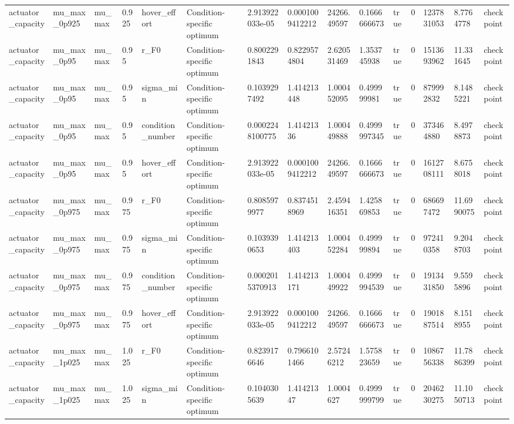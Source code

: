\begin{tabular}{@{}lllllllllllllll@{}}
actuator\_capacity & mu\_max\_0p925 & mu\_max & 0.925 & hover\_effort & Condition-specific optimum & 2.913922033e-05 & 0.0001009412212 & 24266.49597 & 0.1666666673 & true & 0 & 1237831053 & 8.7764778 & checkpoint \\
actuator\_capacity & mu\_max\_0p95 & mu\_max & 0.95 & r\_F0 & Condition-specific optimum & 0.8002291843 & 0.8229574804 & 2.620531469 & 1.353745938 & true & 0 & 1513693962 & 11.331645 & checkpoint \\
actuator\_capacity & mu\_max\_0p95 & mu\_max & 0.95 & sigma\_min & Condition-specific optimum & 0.1039297492 & 1.414213448 & 1.000452095 & 0.499999981 & true & 0 & 879992832 & 8.1485221 & checkpoint \\
actuator\_capacity & mu\_max\_0p95 & mu\_max & 0.95 & condition\_number & Condition-specific optimum & 0.0002248100775 & 1.41421336 & 1.000449888 & 0.4999997345 & true & 0 & 373464880 & 8.4978873 & checkpoint \\
actuator\_capacity & mu\_max\_0p95 & mu\_max & 0.95 & hover\_effort & Condition-specific optimum & 2.913922033e-05 & 0.0001009412212 & 24266.49597 & 0.1666666673 & true & 0 & 1612708111 & 8.6758018 & checkpoint \\
actuator\_capacity & mu\_max\_0p975 & mu\_max & 0.975 & r\_F0 & Condition-specific optimum & 0.8085979977 & 0.8374518969 & 2.459416351 & 1.425869853 & true & 0 & 686697472 & 11.6990075 & checkpoint \\
actuator\_capacity & mu\_max\_0p975 & mu\_max & 0.975 & sigma\_min & Condition-specific optimum & 0.1039390653 & 1.414213403 & 1.000452284 & 0.499999894 & true & 0 & 972410358 & 9.2048703 & checkpoint \\
actuator\_capacity & mu\_max\_0p975 & mu\_max & 0.975 & condition\_number & Condition-specific optimum & 0.0002015370913 & 1.414213171 & 1.000449922 & 0.4999994539 & true & 0 & 1913431850 & 9.5595896 & checkpoint \\
actuator\_capacity & mu\_max\_0p975 & mu\_max & 0.975 & hover\_effort & Condition-specific optimum & 2.913922033e-05 & 0.0001009412212 & 24266.49597 & 0.1666666673 & true & 0 & 1901887514 & 8.1518955 & checkpoint \\
actuator\_capacity & mu\_max\_1p025 & mu\_max & 1.025 & r\_F0 & Condition-specific optimum & 0.8239176646 & 0.7966101466 & 2.57246212 & 1.575823659 & true & 0 & 1086756338 & 11.7886399 & checkpoint \\
actuator\_capacity & mu\_max\_1p025 & mu\_max & 1.025 & sigma\_min & Condition-specific optimum & 0.1040305639 & 1.41421347 & 1.0004627 & 0.4999999799 & true & 0 & 2046230275 & 11.1050713 & checkpoint \\

\end{tabular}

